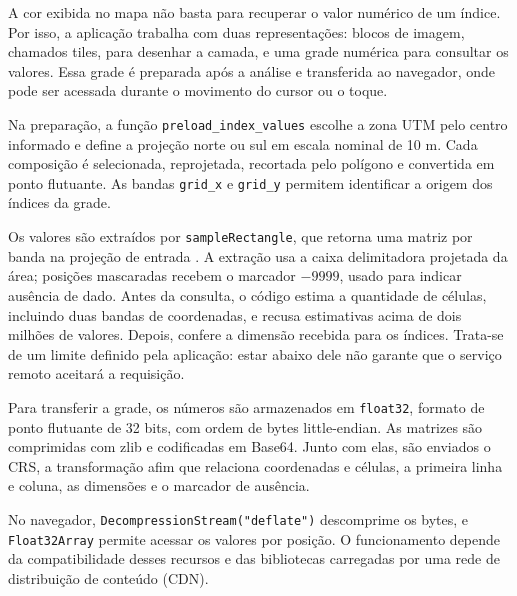 A cor exibida no mapa não basta para recuperar o valor numérico de um índice. Por isso, a aplicação trabalha com duas representações: blocos de imagem, chamados tiles, para desenhar a camada, e uma grade numérica para consultar os valores. Essa grade é preparada após a análise e transferida ao navegador, onde pode ser acessada durante o movimento do cursor ou o toque.

Na preparação, a função \texttt{preload\_index\_values} escolhe a zona UTM pelo centro informado e define a projeção norte ou sul em escala nominal de 10 m. Cada composição é selecionada, reprojetada, recortada pelo polígono e convertida em ponto flutuante. As bandas \texttt{grid\_x} e \texttt{grid\_y} permitem identificar a origem dos índices da grade.

Os valores são extraídos por \texttt{sampleRectangle}, que retorna uma matriz por banda na projeção de entrada \citep{GOOGLE_EE_SAMPLE}. A extração usa a caixa delimitadora projetada da área; posições mascaradas recebem o marcador $-9999$, usado para indicar ausência de dado. Antes da consulta, o código estima a quantidade de células, incluindo duas bandas de coordenadas, e recusa estimativas acima de dois milhões de valores. Depois, confere a dimensão recebida para os índices. Trata-se de um limite definido pela aplicação: estar abaixo dele não garante que o serviço remoto aceitará a requisição.

Para transferir a grade, os números são armazenados em \texttt{float32}, formato de ponto flutuante de 32 bits, com ordem de bytes little-endian. As matrizes são comprimidas com zlib e codificadas em Base64. Junto com elas, são enviados o CRS, a transformação afim que relaciona coordenadas e células, a primeira linha e coluna, as dimensões e o marcador de ausência.

No navegador, \texttt{DecompressionStream("deflate")} descomprime os bytes, e \texttt{Float32Array} permite acessar os valores por posição. O funcionamento depende da compatibilidade desses recursos e das bibliotecas carregadas por uma rede de distribuição de conteúdo (CDN).

